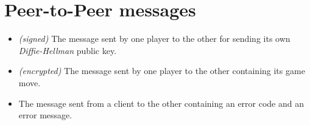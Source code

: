 \section{Peer-to-Peer messages}\label{sec:p2pmsgs}

\begin{itemize}
	\item[]  \emph{(signed)} The message sent by one player
		to the other for sending its own \emph{Diffie-Hellman} public
		key.
	\item[]  \emph{(encrypted)} The message sent by one
		player to the other containing its game move.
	\item[]  The message sent from a client to the other
		containing an error code and an error message.
\end{itemize}
